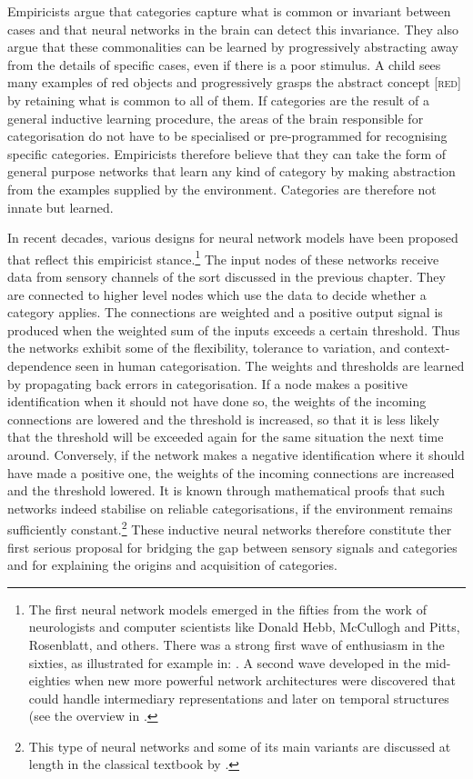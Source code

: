 Empiricists argue that categories 
capture what is common or invariant between cases and that
neural networks in the brain
can detect this invariance. They also argue
that these commonalities can be learned
by progressively abstracting away from the details of specific
cases, even if there is a poor stimulus. 
A child sees many examples of red objects and
progressively grasps the abstract concept [\textsc{red}] 
by retaining what is common to all of them. 
If categories are the result of a general 
inductive learning procedure, the areas of the brain
responsible for categorisation do not have to be
specialised or pre-programmed for recognising 
specific categories. Empiricists therefore believe that 
they can take the 
form of general purpose networks that learn any kind 
of category by making abstraction from the examples 
supplied by the environment. Categories are therefore
not innate but learned. 

In recent decades, various designs for neural network models
have been proposed that reflect this empiricist stance.\footnote{
The first neural network models emerged in the 
fifties from the work of neurologists and computer 
scientists like Donald Hebb, McCullogh and Pitts, 
Rosenblatt, and others. There was a strong first wave of 
enthusiasm in the sixties, as illustrated for 
example in: \cite{Minsky:1968}. 
A second wave developed in the mid-eighties when 
new more powerful network architectures were discovered
that could handle intermediary representations and 
later on temporal structures (see the overview 
in \cite{Churchland:1992}. }
The input nodes of these networks receive data
from sensory channels of the sort discussed in the 
previous chapter. They are connected to higher
level nodes which use the data to decide whether
a category applies. The connections are weighted and 
a positive output signal is produced when 
the weighted sum of the inputs 
exceeds a certain threshold. Thus the networks
exhibit some of the flexibility, tolerance
to variation, and context-dependence seen in human
categorisation. The weights and thresholds are 
learned by propagating back errors in categorisation. 
If a node makes a positive identification when 
it should not have done so, the weights of the 
incoming connections are lowered and the threshold is
increased, so that it is less likely that the threshold
will be exceeded again for the same situation the next time around. 
Conversely, if the network makes a negative identification where
it should have made a positive one, the weights 
of the incoming connections are increased 
and the threshold lowered. It is known 
through mathematical proofs that such networks indeed
stabilise on reliable categorisations, if the 
environment remains sufficiently constant.\footnote{
This type of neural networks and some of its
main variants are discussed at length in the classical 
textbook by \cite{Rumelhart:1986}.}
These inductive neural networks therefore
constitute ther first serious proposal for bridging the gap between
sensory signals and categories and for explaining the 
origins and acquisition of categories. 

